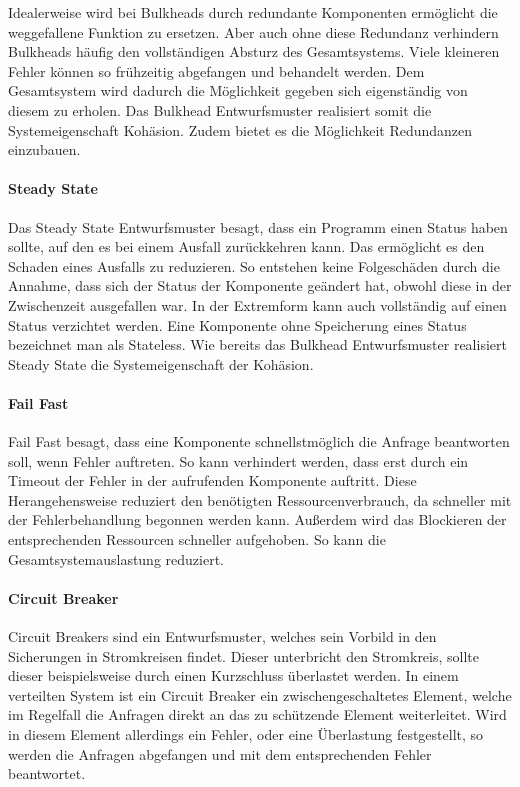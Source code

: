 \documentclass[]{lni}
\begin{document}
Idealerweise wird bei Bulkheads durch redundante Komponenten ermöglicht die weggefallene Funktion zu ersetzen.
Aber auch ohne diese Redundanz verhindern Bulkheads häufig den vollständigen Absturz des Gesamtsystems.
Viele kleineren Fehler können so frühzeitig abgefangen und behandelt werden.
Dem Gesamtsystem wird dadurch die Möglichkeit gegeben sich eigenständig von diesem zu erholen.
Das Bulkhead Entwurfsmuster realisiert somit die Systemeigenschaft Kohäsion.
Zudem bietet es die Möglichkeit Redundanzen einzubauen.

\paragraph{Steady State}
Das Steady State Entwurfsmuster besagt, dass ein Programm einen Status haben sollte, auf den es bei einem Ausfall zurückkehren kann.
Das ermöglicht es den Schaden eines Ausfalls zu reduzieren.
So entstehen keine Folgeschäden durch die Annahme, dass sich der Status der Komponente geändert hat, obwohl diese in der Zwischenzeit ausgefallen war.
In der Extremform kann auch vollständig auf einen Status verzichtet werden.
Eine Komponente ohne Speicherung eines Status bezeichnet man als Stateless.
Wie bereits das Bulkhead Entwurfsmuster realisiert Steady State die Systemeigenschaft der Kohäsion.

\paragraph{Fail Fast}
Fail Fast besagt, dass eine Komponente schnellstmöglich die Anfrage beantworten soll, wenn Fehler auftreten.
So kann verhindert werden, dass erst durch ein Timeout der Fehler in der aufrufenden Komponente auftritt.
Diese Herangehensweise reduziert den benötigten Ressourcenverbrauch, da schneller mit der Fehlerbehandlung begonnen werden kann.
Außerdem wird das Blockieren der entsprechenden Ressourcen schneller aufgehoben.
So kann die Gesamtsystemauslastung reduziert.

\paragraph{Circuit Breaker}
Circuit Breakers sind ein Entwurfsmuster, welches sein Vorbild in den Sicherungen in Stromkreisen findet.
Dieser unterbricht den Stromkreis, sollte dieser beispielsweise durch einen Kurzschluss überlastet werden.
In einem verteilten System ist ein Circuit Breaker ein zwischengeschaltetes Element, welche im Regelfall die Anfragen direkt an das zu schützende Element weiterleitet.
Wird in diesem Element allerdings ein Fehler, oder eine Überlastung festgestellt, so werden die Anfragen abgefangen und mit dem entsprechenden Fehler beantwortet.
\end{document}
